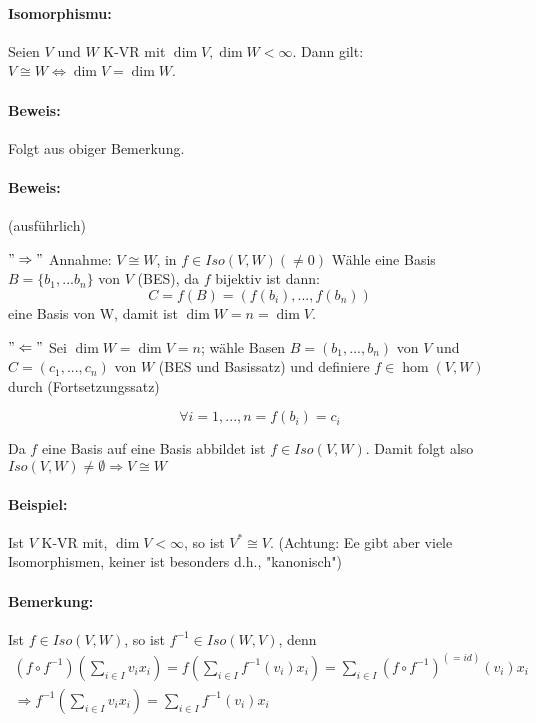 	\paragraph{Isomorphismu: }
		Seien $V$ und $W$ K-VR mit $\dim V, \dim W < \infty$. Dann gilt: $V \cong W \Leftrightarrow \dim V = \dim W$.
	
	\paragraph{Beweis: }
		Folgt aus obiger Bemerkung.
	
	\paragraph{Beweis: } (ausführlich)
		
	$"\Rightarrow"$ Annahme: $V \cong W$, in $f\in Iso(V,W)(\neq 0)$ Wähle eine Basis $B = \{{b_1, ... b_n\}}$ von $V$ (BES), da $f$ bijektiv ist dann:
	\begin{equation*}
		C = f(B) = (f(b_i), ... , f(b_n))
	\end{equation*}
		eine Basis von W, damit ist $\dim W = n = \dim V$.
	
	$"\Leftarrow"$ Sei $\dim W = \dim V = n$; wähle Basen $B = (b_1, ... ,b_n)$ von $V$ und $C = (c_1, ... ,c_n)$ von $W$ (BES und Basissatz) und definiere $f\in \hom(V,W)$ durch (Fortsetzungssatz)
	
	\begin{equation*}
	\forall i = 1, ... ,n = f(b_i) = c_i
	\end{equation*}
		
	Da $f$ eine Basis auf eine Basis abbildet ist $f\in Iso(V,W)$. Damit folgt also $Iso(V,W) \neq \emptyset \Rightarrow V \cong W$
			
	\paragraph{Beispiel: }
		Ist $V$ K-VR mit, $\dim V < \infty$, so ist $V^\ast \cong V$. (Achtung: Ee gibt aber viele Isomorphismen, keiner ist besonders d.h., "kanonisch")
	
	\paragraph{Bemerkung: }
		Ist $f\in Iso(V,W)$, so ist $f^{-1}\in Iso(W,V)$, denn
			\begin{gather*}
			(f\circ f^{-1})(\sum_{i\in I}v_ix_i) = f(\sum_{i\in I}f^{-1}(v_i)x_i) = \sum_{i\in I}(f\circ f^{-1})^{(= id)}(v_i)x_i\\
			\Rightarrow f^{-1}(\sum_{i\in I}v_ix_i) = \sum_{i\in I}f^{-1}(v_i)x_i
			\end{gather*}
